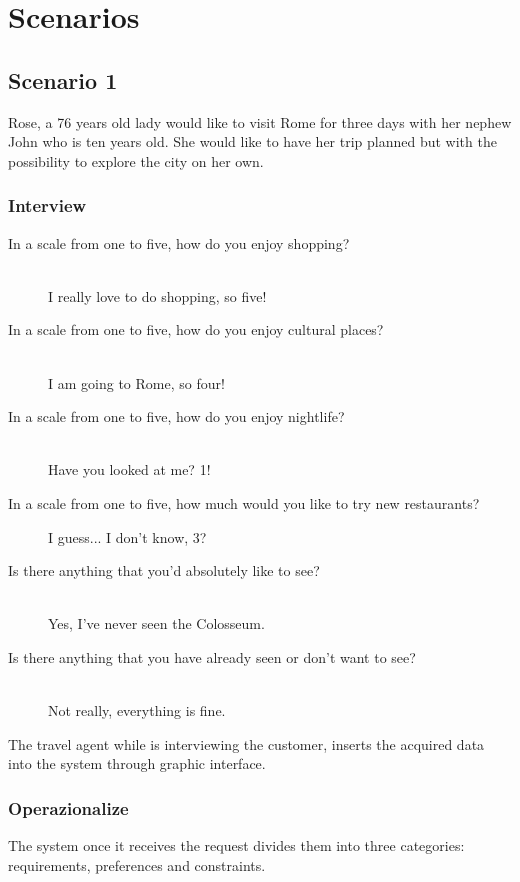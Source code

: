 \documentclass[11pt]{article} %
\begin{document}
\section{Scenarios}

\subsection{Scenario 1}

Rose, a 76 years old lady would like to visit Rome for three days with her nephew John who is ten years old. She would like to have her trip planned but with the possibility to explore the city on her own. 

\subsubsection{Interview}

\begin{description}
  \item[In a scale from one to five, how do you enjoy shopping?] \hfill \\
  I really love to do shopping, so five!
  \item[In a scale from one to five, how do you enjoy cultural places?] \hfill \\
  I am going to Rome, so four!
  \item[In a scale from one to five, how do you enjoy nightlife?] \hfill \\
  Have you looked at me? 1!
  \item[In a scale from one to five, how much would you like to try new restaurants?] \hfill 
  I guess... I don't know, 3?
  \item[Is there anything that you'd absolutely like to see?] \hfill \\
  Yes, I've never seen the Colosseum.
  \item[Is there anything that you have already seen or don't want to see?] \hfill \\
  Not really, everything is fine.
\end{description}

The travel agent while is interviewing the customer, inserts the acquired data into the system through graphic interface.

\subsubsection{Operazionalize}
The system once it receives the request divides them into three categories: requirements, preferences and constraints.
\end{document}
